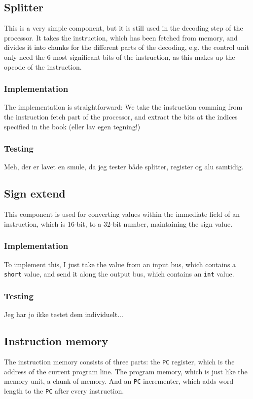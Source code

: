 \subsection{Splitter}
This is a very simple component, but it is still used in the decoding step of
the processor. It takes the instruction, which has been fetched from memory,
and divides it into chunks for the different parts of the decoding, e.g. the
control unit only need the 6 most significant bits of the instruction, as this
makes up the opcode of the instruction.

\subsubsection*{Implementation}
The implementation is straightforward: We take the instruction comming from the
instruction fetch part of the processor, and extract the bits at the indices
specified in the book (eller lav egen tegning!)

\subsubsection*{Testing}
Meh, der er lavet en smule, da jeg tester både splitter, register og alu
samtidig.

\subsection{Sign extend}
This component is used for converting values within the immediate field of an
instruction, which is 16-bit, to a 32-bit number, maintaining the sign value.

\subsubsection*{Implementation}
To implement this, I just take the value from an input bus, which contains a
\texttt{short} value, and send it along the output bus, which contains an
\texttt{int} value.

\subsubsection*{Testing}
Jeg har jo ikke testet dem individuelt...

\subsection{Instruction memory}
The instruction memory consists of three parts: the \texttt{PC} register, which
is the address of the current program line. The program memory, which is just
like the memory unit, a chunk of memory. And an \texttt{PC} incrementer, which
adds word length to the \texttt{PC} after every instruction.

